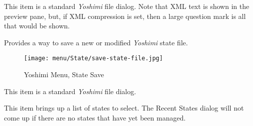    This item is a standard \textsl{Yoshimi} file dialog.
   Note that XML text is shown in the preview pane, but, if XML compression is
   set, then a large question mark is all that would be shown.

   Provides a way to save a new or modified \textsl{Yoshimi} state file.

\begin{figure}[H]
   \centering 
   \texttt{[image: menu/State/save-state-file.jpg]}
   \caption{Yoshimi Menu, State Save}
   \label{fig:yoshimi_menu_state_save}
\end{figure}

   This item is a standard \textsl{Yoshimi} file dialog.

   This item brings up a list of states to select.
   The Recent States dialog will not come up if there are no states that have
   yet been managed.

